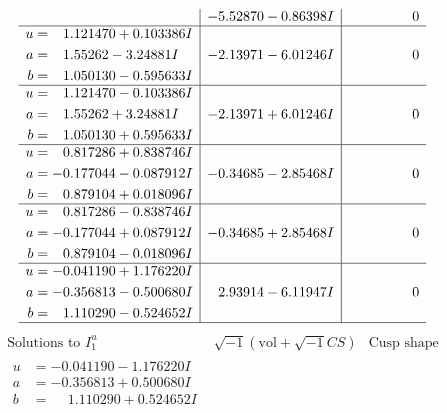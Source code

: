 \documentclass[1p]{elsarticle_modified}
\theoremstyle{definition}
\newcommand{\I}{\sqrt{-1}}
\begin{document}
$$\begin{array}{c|c|c}
 & -5.52870 - 0.86398 I & \phantom{-0.000000 } 0 \\ \hline\begin{aligned}
u &= \phantom{-}1.121470 + 0.103386 I \\
a &= \phantom{-}1.55262 - 3.24881 I \\
b &= \phantom{-}1.050130 - 0.595633 I\end{aligned}
 & -2.13971 - 6.01246 I & \phantom{-0.000000 } 0 \\ \hline\begin{aligned}
u &= \phantom{-}1.121470 - 0.103386 I \\
a &= \phantom{-}1.55262 + 3.24881 I \\
b &= \phantom{-}1.050130 + 0.595633 I\end{aligned}
 & -2.13971 + 6.01246 I & \phantom{-0.000000 } 0 \\ \hline\begin{aligned}
u &= \phantom{-}0.817286 + 0.838746 I \\
a &= -0.177044 - 0.087912 I \\
b &= \phantom{-}0.879104 + 0.018096 I\end{aligned}
 & -0.34685 - 2.85468 I & \phantom{-0.000000 } 0 \\ \hline\begin{aligned}
u &= \phantom{-}0.817286 - 0.838746 I \\
a &= -0.177044 + 0.087912 I \\
b &= \phantom{-}0.879104 - 0.018096 I\end{aligned}
 & -0.34685 + 2.85468 I & \phantom{-0.000000 } 0 \\ \hline\begin{aligned}
u &= -0.041190 + 1.176220 I \\
a &= -0.356813 - 0.500680 I \\
b &= \phantom{-}1.110290 - 0.524652 I\end{aligned}
 & \phantom{-}2.93914 - 6.11947 I & \phantom{-0.000000 } 0\\
 \hline 
 \end{array}$$\newpage$$\begin{array}{c|c|c}  
\text{Solutions to }I^u_{1}& \I (\text{vol} + \sqrt{-1}CS) & \text{Cusp shape}\\
 \hline 
\begin{aligned}
u &= -0.041190 - 1.176220 I \\
a &= -0.356813 + 0.500680 I \\
b &= \phantom{-}1.110290 + 0.524652 I\end{aligned}

\end{array}$$
\end{document}
